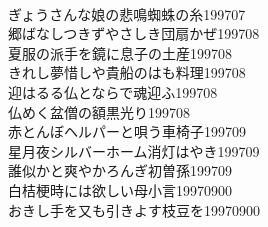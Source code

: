 \begin{multicols}{2}
\\ぎょうさんな娘の悲鳴蜘蛛の糸\hfill{199707}
\\郷ばなしつきずやさしき団扇かぜ\hfill{199708}
\\夏服の派手を鏡に息子の土産\hfill{199708}
\\きれし夢惜しや貴船のはも料理\hfill{199708}
\\迎はるる仏とならで魂迎ふ\hfill{199708}
\\仏めく盆僧の額黒光り\hfill{199708}
\\赤とんぼヘルパーと唄う車椅子\hfill{199709}
\\星月夜シルバーホーム消灯はやき\hfill{199709}
\\誰似かと爽やかろんぎ初曽孫\hfill{199709}
\\白桔梗時には欲しい母小言\hfill{19970900}
\\おきし手を又も引きよす枝豆を\hfill{19970900}
\end{multicols}
